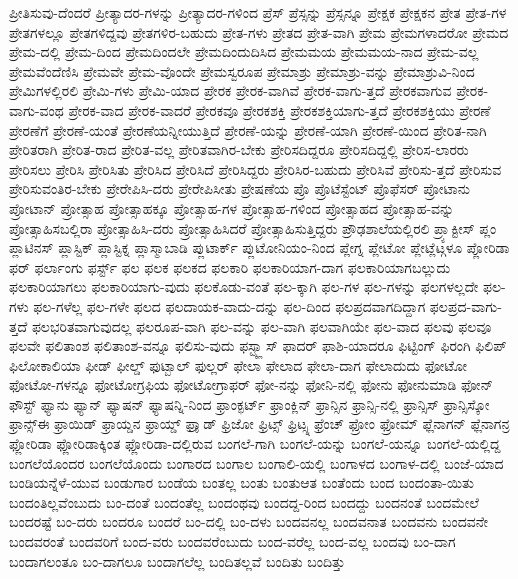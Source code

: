 {ಪ್ರೀತಿಸುವು-ದೆಂದರೆ
ಪ್ರೀತ್ಯಾದರ-ಗಳನ್ನು
ಪ್ರೀತ್ಯಾದರ-ಗಳಿಂದ
ಪ್ರೆಸ್
ಪ್ರೆಸ್ಸನ್ನು
ಪ್ರೆಸ್ಸನ್ನೂ
ಪ್ರೇಕ್ಷಕ
ಪ್ರೇಕ್ಷಕನ
ಪ್ರೇತ
ಪ್ರೇತ-ಗಳ
ಪ್ರೇತಗಳಲ್ಲೂ
ಪ್ರೇತಗಳಿದ್ದವು
ಪ್ರೇತಗಳಿರ-ಬಹುದು
ಪ್ರೇತ-ಗಳು
ಪ್ರೇತದ
ಪ್ರೇತ-ವಾಗಿ
ಪ್ರೇಮ
ಪ್ರೇಮಗಳಾದರೋ
ಪ್ರೇಮದ
ಪ್ರೇಮ-ದಲ್ಲಿ
ಪ್ರೇಮ-ದಿಂದ
ಪ್ರೇಮದಿಂದಲೇ
ಪ್ರೇಮದಿಂದುದಿಸಿದ
ಪ್ರೇಮಮಯ
ಪ್ರೇಮಮಯ-ನಾದ
ಪ್ರೇಮ-ವಲ್ಲ
ಪ್ರೇಮವೆಂದೆಣಿಸಿ
ಪ್ರೇಮವೇ
ಪ್ರೇಮ-ವೊಂದೇ
ಪ್ರೇಮಸ್ವರೂಪ
ಪ್ರೇಮಾಶ್ರು
ಪ್ರೇಮಾಶ್ರು-ವನ್ನು
ಪ್ರೇಮಾಶ್ರುವಿ-ನಿಂದ
ಪ್ರೇಮಿಗಳಲ್ಲಿರಲಿ
ಪ್ರೇಮಿ-ಗಳು
ಪ್ರೇಮಿ-ಯಾದ
ಪ್ರೇರಕ
ಪ್ರೇರಕ-ವಾಗಿವೆ
ಪ್ರೇರಕ-ವಾಗು-ತ್ತದೆ
ಪ್ರೇರಕವಾಗುವ
ಪ್ರೇರಕ-ವಾಗು-ವಂಥ
ಪ್ರೇರಕ-ವಾದ
ಪ್ರೇರಕ-ವಾದರೆ
ಪ್ರೇರಕವೂ
ಪ್ರೇರಕಶಕ್ತಿ
ಪ್ರೇರಕಶಕ್ತಿಯಾಗು-ತ್ತದೆ
ಪ್ರೇರಕಶಕ್ತಿಯು
ಪ್ರೇರಣೆ
ಪ್ರೇರಣೆಗೆ
ಪ್ರೇರಣೆ-ಯಂತೆ
ಪ್ರೇರಣೆಯನ್ನೀಯುತ್ತಿದೆ
ಪ್ರೇರಣೆ-ಯನ್ನು
ಪ್ರೇರಣೆ-ಯಾಗಿ
ಪ್ರೇರಣೆ-ಯಿಂದ
ಪ್ರೇರಿತ-ನಾಗಿ
ಪ್ರೇರಿತರಾಗಿ
ಪ್ರೇರಿತ-ರಾದ
ಪ್ರೇರಿತ-ವಲ್ಲ
ಪ್ರೇರಿತವಾಗಿರ-ಬೇಕು
ಪ್ರೇರಿಸದಿದ್ದರೂ
ಪ್ರೇರಿಸದಿದ್ದಲ್ಲಿ
ಪ್ರೇರಿಸ-ಲಾರರು
ಪ್ರೇರಿಸಲು
ಪ್ರೇರಿಸಿ
ಪ್ರೇರಿಸಿತು
ಪ್ರೇರಿಸಿದ
ಪ್ರೇರಿಸಿದೆ
ಪ್ರೇರಿಸಿದ್ದರು
ಪ್ರೇರಿಸಿರ-ಬಹುದು
ಪ್ರೇರಿಸಿವೆ
ಪ್ರೇರಿಸು-ತ್ತದೆ
ಪ್ರೇರಿಸುವ
ಪ್ರೇರಿಸುವಂತಿರ-ಬೇಕು
ಪ್ರೇರೇಪಿಸಿ-ದರು
ಪ್ರೇರೇಪಿಸೀತು
ಪ್ರೇಷಣೆಯ
ಪ್ರೊ
ಪ್ರೊಟೆಸ್ಟೆಂಟ್
ಪ್ರೊಫೆಸರ್
ಪ್ರೋಟಾನು
ಪ್ರೋಟಾನ್
ಪ್ರೋತ್ಸಾಹ
ಪ್ರೋತ್ಸಾಹಕ್ಕೂ
ಪ್ರೋತ್ಸಾಹ-ಗಳ
ಪ್ರೋತ್ಸಾಹ-ಗಳಿಂದ
ಪ್ರೋತ್ಸಾಹದ
ಪ್ರೋತ್ಸಾಹ-ವನ್ನು
ಪ್ರೋತ್ಸಾಹಿಸಬಲ್ಲಿರಾ
ಪ್ರೋತ್ಸಾಹಿಸಿ-ದರು
ಪ್ರೋತ್ಸಾಹಿಸಿದರೆ
ಪ್ರೋತ್ಸಾಹಿಸುತ್ತಿದ್ದರು
ಪ್ರೌಢಶಾಲೆಯಲ್ಲಿರಲಿ
ಪ್ರ್ಯಾಕ್ಟೀಸ್
ಪ್ಲಂ
ಪ್ಲಾಟಿನಸ್
ಪ್ಲಾಸ್ಟಿಕ್
ಪ್ಲಾಸ್ಟಿಕ್ನ
ಪ್ಲಾಸ್ಮಾಬಾಡಿ
ಪ್ಲುಟಾರ್ಕ್
ಪ್ಲುಟೋನಿಯಂ-ನಿಂದ
ಪ್ಲೇಗ್ನ
ಪ್ಲೇಟೋ
ಪ್ಲೇಟ್ಲೆಟ್ಗಳೂ
ಪ್ಲೋರಿಡಾ
ಫರ್
ಫರ್ಲಾಂಗು
ಫರ್ಸ್ಟ್
ಫಲ
ಫಲಕ
ಫಲಕದ
ಫಲಕಾರಿ
ಫಲಕಾರಿಯಾಗ-ದಾಗ
ಫಲಕಾರಿಯಾಗಬಲ್ಲುದು
ಫಲಕಾರಿಯಾಗಲು
ಫಲಕಾರಿಯಾಗು-ವುದು
ಫಲಕೊಡು-ವಂತೆ
ಫಲ-ಕ್ಕಾಗಿ
ಫಲ-ಗಳ
ಫಲ-ಗಳನ್ನು
ಫಲಗಳಲ್ಲದೇ
ಫಲ-ಗಳು
ಫಲ-ಗಳೆಲ್ಲ
ಫಲ-ಗಳೇ
ಫಲದ
ಫಲದಾಯಕ-ವಾದು-ದನ್ನು
ಫಲ-ದಿಂದ
ಫಲಪ್ರದವಾಗದಿದ್ದಾಗ
ಫಲಪ್ರದ-ವಾಗು-ತ್ತದೆ
ಫಲಭರಿತವಾಗುವುದಲ್ಲ
ಫಲರೂಪ-ವಾಗಿ
ಫಲ-ವನ್ನು
ಫಲ-ವಾಗಿ
ಫಲವಾಗಿಯೇ
ಫಲ-ವಾದ
ಫಲವು
ಫಲವೂ
ಫಲವೇ
ಫಲಿತಾಂಶ
ಫಲಿತಾಂಶ-ವನ್ನೂ
ಫಲಿಸು-ವುದು
ಫಸ್ಟ್ಕ್ಲಾಸ್
ಫಾದರ್
ಫಾಶಿ-ಯಾದರೂ
ಫಿಟ್ಟಿಂಗ್
ಫಿರಂಗಿ
ಫಿಲಿಪ್
ಫಿಲೋಕಾಲಿಯಾ
ಫೀಡ್
ಫೀಲ್ಡ್
ಫುಟ್ಬಾಲ್
ಫುಲ್ಲರ್
ಫೇಲಾ
ಫೇಲಾದ
ಫೇಲಾ-ದಾಗ
ಫೇಲಾದುದು
ಫೋಟೋ
ಫೋಟೋ-ಗಳನ್ನೂ
ಫೋಟೋಗ್ರಫಿಯ
ಫೋಟೋಗ್ರಾಫರ್
ಫೋ-ನನ್ನು
ಫೋನಿ-ನಲ್ಲಿ
ಫೋನು
ಫೋನುಮಾಡಿ
ಫೋನ್
ಫೌಸ್ಟ್
ಫ್ಯಾನು
ಫ್ಯಾನ್
ಫ್ಯಾಷನ್
ಫ್ಯಾಷನ್ನಿ-ನಿಂದ
ಫ್ರಾಂಕ್ಫರ್ಟ್
ಫ್ರಾಂಕ್ಲಿನ್
ಫ್ರಾನ್ಸಿನ
ಫ್ರಾನ್ಸಿ-ನಲ್ಲಿ
ಫ್ರಾನ್ಸಿಸ್
ಫ್ರಾನ್ಸಿಸ್ಕೋ
ಫ್ರಾನ್ಸ್ಈ
ಫ್ರಾಯಿಡ್
ಫ್ರಾಯ್ಡನ
ಫ್ರಾಯ್ಡ್
ಫ್ರಾೖಡ್
ಫ್ರಿಜೋ
ಫ್ರಿಟ್ಸ್
ಫ್ರಿಟ್ಸ್ನ
ಫ್ರೆಂಚ್
ಫ್ರೋಂ
ಫ್ರೋಮ್
ಫ್ಲೆನಾಗನ್
ಫ್ಲೆನಾಗನ್ರ
ಫ್ಲೋರಿಡಾ
ಫ್ಲೋರಿಡಾಕ್ಕಿಂತ
ಫ್ಲೋರಿಡಾ-ದಲ್ಲಿರುವ
ಬಂಗಲೆ-ಗಾಗಿ
ಬಂಗಲೆ-ಯನ್ನು
ಬಂಗಲೆ-ಯನ್ನೂ
ಬಂಗಲೆ-ಯಲ್ಲಿದ್ದ
ಬಂಗಲೆಯೊಂದರ
ಬಂಗಲೆಯೊಂದು
ಬಂಗಾರದ
ಬಂಗಾಲ
ಬಂಗಾಲಿ-ಯಲ್ಲಿ
ಬಂಗಾಳದ
ಬಂಗಾಳ-ದಲ್ಲಿ
ಬಂಜೆ-ಯಾದ
ಬಂಡಿಯನ್ನೆಳೆ-ಯುವ
ಬಂಡುಗಾರ
ಬಂಡೆಯ
ಬಂತಲ್ಲ
ಬಂತು
ಬಂತುಆತ
ಬಂತೆಂದು
ಬಂದ
ಬಂದಂತಾ-ಯಿತು
ಬಂದಂತಿಲ್ಲವೆಂಬುದು
ಬಂ-ದಂತೆ
ಬಂದಂತೆಲ್ಲ
ಬಂದಂಥವು
ಬಂದದ್ದ-ರಿಂದ
ಬಂದದ್ದು
ಬಂದನಂತೆ
ಬಂದಮೇಲೆ
ಬಂದರಷ್ಟೆ
ಬಂ-ದರು
ಬಂದರೂ
ಬಂದರೆ
ಬಂ-ದಲ್ಲಿ
ಬಂ-ದಳು
ಬಂದವನಲ್ಲ
ಬಂದವನಾತ
ಬಂದವನು
ಬಂದವನೇ
ಬಂದವರಂತೆ
ಬಂದವರಿಗೆ
ಬಂದ-ವರು
ಬಂದವರೆಂಬುದು
ಬಂದ-ವರೆಲ್ಲ
ಬಂದ-ವಲ್ಲ
ಬಂದವು
ಬಂ-ದಾಗ
ಬಂದಾಗಲಂತೂ
ಬಂ-ದಾಗಲೂ
ಬಂದಾಗಲೆಲ್ಲ
ಬಂದಿತಲ್ಲವೆ
ಬಂದಿತು
ಬಂದಿತ್ತು
}
